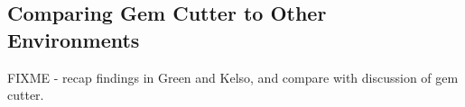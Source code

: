 \subsection{Comparing Gem Cutter to Other Environments}

FIXME - recap findings in Green and Kelso, and compare with discussion of gem cutter.
